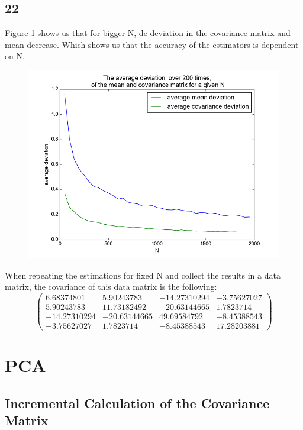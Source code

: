 \documentclass[a4paper,12px]{article}
\begin{document}
\subsection{22}
Figure \ref{fig:22} shows us that for bigger N, de deviation in the covariance matrix
 and mean decrease. Which shows us that the accuracy of the estimators is dependent on N.
\begin{figure}
    \centering
    \includegraphics[width=1\textwidth]{fig22.png}
    \caption{}
    \label{fig:22}
\end{figure}
\FloatBarrier
When repeating the estimations for fixed N and collect the results in a data
 matrix, the covariance of this data matrix is the following:
\begin{equation}
\left(\begin{matrix}
  6.68374801 &   5.90243783 & -14.27310294 & -3.75627027\\
  5.90243783 &  11.73182492 & -20.63144665 &  1.7823714 \\
-14.27310294 & -20.63144665 &  49.69584792 & -8.45388543\\
 -3.75627027 &   1.7823714  &  -8.45388543 & 17.28203881\end{matrix}\right)
\end{equation}


\section{PCA}

\subsection{Incremental Calculation of the Covariance Matrix}
\end{document}

